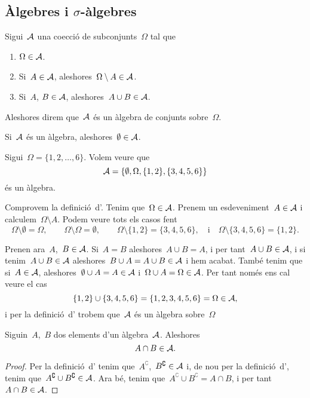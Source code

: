 \documentclass[../Apunts.tex]{subfiles}
\begin{document}
\subsection{Àlgebres i \ensuremath{\sigma}-àlgebres}
	\begin{definition}[Àlgebra]
		\label{def:àlgebra}
		Sigui~\(\mathcal{A}\) una co{\lgem}ecció de subconjunts~\(\Omega\) tal que
		\begin{enumerate}
			\item \(\Omega\in\mathcal{A}\).
			\item Si~\(A\in\mathcal{A}\), aleshores~\(\Omega\setminus A\in\mathcal{A}\).
			\item Si~\(A\), \(B\in\mathcal{A}\), aleshores~\(A\cup B\in\mathcal{A}\).
		\end{enumerate}
		Aleshores direm que~\(\mathcal{A}\) és un àlgebra de conjunts sobre~\(\Omega\).
	\end{definition}
	\begin{observation}
		\label{obs:el conjunt buit pertany a qualsevol àlgebra}
		Si~\(\mathcal{A}\) és un àlgebra, aleshores~\(\emptyset\in\mathcal{A}\).
	\end{observation}
	\begin{example}
		\label{ex:exemple d'àlgebra}
		Sigui~\(\Omega=\{1,2,\dots,6\}\). Volem veure que
		\[\mathcal{A}=\{\emptyset,\Omega,\{1,2\},\{3,4,5,6\}\}\]
		és un àlgebra.
		\begin{solution}
			Comprovem la definició~d'. Tenim que~\(\Omega\in\mathcal{A}\). Prenem un esdeveniment~\(A\in\mathcal{A}\) i calculem~\(\Omega\setminus A\). Podem veure tots els casos fent
			\[
				\Omega\setminus\emptyset=\Omega,\qquad
				\Omega\setminus\Omega=\emptyset,\qquad
				\Omega\setminus\{1,2\}=\{3,4,5,6\},\quad\text{i}\quad
				\Omega\setminus\{3,4,5,6\}=\{1,2\}.
			\]
			
			Prenen ara~\(A\),~\(B\in\mathcal{A}\). Si~\(A=B\) aleshores~\(A\cup B=A\), i per tant~\(A\cup B\in\mathcal{A}\), i si tenim~\(A\cup B\in\mathcal{A}\) aleshores~\(B\cup A=A\cup B\in\mathcal{A}\) i hem acabat. També tenim que si~\(A\in\mathcal{A}\), aleshores~\(\emptyset\cup A=A\in\mathcal{A}\) i~\(\Omega\cup A=\Omega\in\mathcal{A}\). Per tant només ens cal veure el cas
			\[
				\{1,2\}\cup\{3,4,5,6\}=\{1,2,3,4,5,6\}=\Omega\in\mathcal{A},
			\]
			i per la definició~d' trobem que~\(\mathcal{A}\) és un àlgebra sobre~\(\Omega\)
		\end{solution}
	\end{example}
	\begin{proposition}
		\label{prop:les àlgebras són tancades per interseccions}
		Siguin~\(A\),~\(B\) dos elements d'un àlgebra~\(\mathcal{A}\). Aleshores
		\[A\cap B\in\mathcal{A}.\]
		\begin{proof}
			Per la definició~d' tenim que~\(A^{\complement}\),~\(B^{\complement}\in\mathcal{A}\) i, de nou per la definició~d', tenim que~\(A^{\complement}\cup B^{\complement}\in\mathcal{A}\). Ara bé,%
			tenim que~\(A^{\complement}\cup B^{\complement}=A\cap B\), i per tant~\(A\cap B\in\mathcal{A}\).
		\end{proof}
	\end{proposition}
\end{document}
